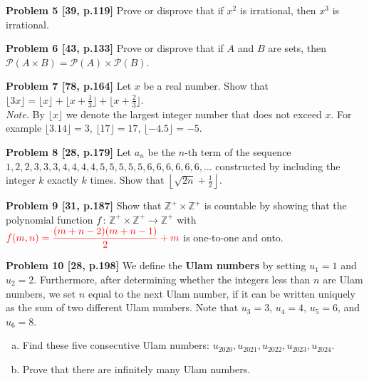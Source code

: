 \documentclass[jou]{apa6}
\begin{document}
\vspace{2ex}
{\bf Problem 5 [39, p.119]} 
Prove or disprove that if $x^2$ is irrational, then $x^3$ is irrational. 

\vspace{2ex}
{\bf Problem 6 [43, p.133]}
Prove or disprove that if $A$ and $B$ are sets, then 
$\mathcal{P}(A \times B) = \mathcal{P}(A) \times \mathcal{P}(B)$.

\vspace{2ex}
{\bf Problem 7 [78, p.164]}
Let $x$ be a real number. Show that 
$\lfloor 3x \rfloor = \lfloor x \rfloor + \lfloor x + \frac{1}{3} \rfloor +
\lfloor x + \frac{2}{3} \rfloor$.\\
{\color{red} {\em Note.} By $\lfloor x \rfloor$ we denote the 
largest integer number that does not exceed $x$. 
For example $\lfloor 3.14 \rfloor = 3$, $\lfloor 17 \rfloor = 17$, 
$\lfloor -4.5 \rfloor = -5$. }

\vspace{2ex}
{\bf Problem 8 [28, p.179]}
Let $a_n$ be the $n$-th term of the sequence $1, 2,2, 3,3,3, 4,4,4,4, 5,5,5,5,5, 6,6,6,6,6,6,\ldots$
constructed by including the integer $k$ exactly $k$ times. Show that 
${\displaystyle \left\lfloor \sqrt{2n} + \frac{1}{2} \right\rfloor}$. 


\vspace{2ex}
{\bf Problem 9 [31, p.187]}
Show that $\mathbb{Z}^{+} \times \mathbb{Z}^{+}$ is countable by showing that
the polynomial function $f\,:\,\mathbb{Z}^{+} \times \mathbb{Z}^{+} \rightarrow \mathbb{Z}^{+}$
with $\color{red} {\displaystyle f(m,n) = \frac{(m+n-2)(m+n-1)}{2} + m}$ is one-to-one and onto.

\vspace{2ex}
{\bf Problem 10 [28, p.198]}
We define the {\bf Ulam numbers} by setting $u_1 = 1$ and $u_2 = 2$. 
Furthermore, after determining whether the integers less than $n$ are 
Ulam numbers, we set $n$ equal to the next Ulam number, if it can be written uniquely as the
sum of two different Ulam numbers. Note that $u_3 = 3$, $u_4 = 4$, 
$u_5 = 6$, and $u_6 = 8$. 
\begin{enumerate}[(a)]
\item Find these five consecutive Ulam numbers: $u_{2020},u_{2021},u_{2022},u_{2023},u_{2024}$. 
\item Prove that there are infinitely many Ulam numbers.
\end{enumerate}
\end{document}
